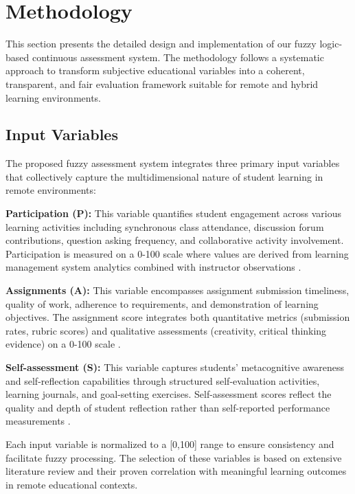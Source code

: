 
\section{Methodology}

This section presents the detailed design and implementation of our fuzzy logic-based continuous assessment system. The methodology follows a systematic approach to transform subjective educational variables into a coherent, transparent, and fair evaluation framework suitable for remote and hybrid learning environments.

\subsection{Input Variables}

The proposed fuzzy assessment system integrates three primary input variables that collectively capture the multidimensional nature of student learning in remote environments:

\textbf{Participation (P):} This variable quantifies student engagement across various learning activities including synchronous class attendance, discussion forum contributions, question asking frequency, and collaborative activity involvement. Participation is measured on a 0-100 scale where values are derived from learning management system analytics combined with instructor observations \cite{Kumar2024}.

\textbf{Assignments (A):} This variable encompasses assignment submission timeliness, quality of work, adherence to requirements, and demonstration of learning objectives. The assignment score integrates both quantitative metrics (submission rates, rubric scores) and qualitative assessments (creativity, critical thinking evidence) on a 0-100 scale \cite{Anderson2022}.

\textbf{Self-assessment (S):} This variable captures students' metacognitive awareness and self-reflection capabilities through structured self-evaluation activities, learning journals, and goal-setting exercises. Self-assessment scores reflect the quality and depth of student reflection rather than self-reported performance measurements \cite{Brown2023}.

Each input variable is normalized to a [0,100] range to ensure consistency and facilitate fuzzy processing. The selection of these variables is based on extensive literature review and their proven correlation with meaningful learning outcomes in remote educational contexts.

